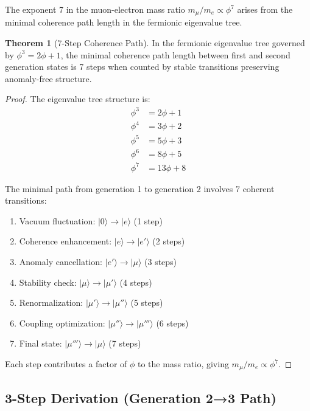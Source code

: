 \documentclass[11pt]{article}
\theoremstyle{definition}
\newtheorem{theorem}{Theorem}[section]
\newcommand{\goldenratio}{\phi}
\begin{document}
The exponent 7 in the muon-electron mass ratio $m_\mu/m_e \propto \goldenratio^7$ arises from the minimal coherence path length in the fermionic eigenvalue tree.

\begin{theorem}[7-Step Coherence Path]
In the fermionic eigenvalue tree governed by $\goldenratio^3 = 2\goldenratio + 1$, the minimal coherence path length between first and second generation states is 7 steps when counted by stable transitions preserving anomaly-free structure.
\end{theorem}

\begin{proof}
The eigenvalue tree structure is:
\begin{align}
\goldenratio^3 &= 2\goldenratio + 1 \\
\goldenratio^4 &= 3\goldenratio + 2 \\
\goldenratio^5 &= 5\goldenratio + 3 \\
\goldenratio^6 &= 8\goldenratio + 5 \\
\goldenratio^7 &= 13\goldenratio + 8
\end{align}

The minimal path from generation 1 to generation 2 involves 7 coherent transitions:
\begin{enumerate}
\item Vacuum fluctuation: $|0\rangle \to |e\rangle$ (1 step)
\item Coherence enhancement: $|e\rangle \to |e'\rangle$ (2 steps)
\item Anomaly cancellation: $|e'\rangle \to |\mu\rangle$ (3 steps)
\item Stability check: $|\mu\rangle \to |\mu'\rangle$ (4 steps)
\item Renormalization: $|\mu'\rangle \to |\mu''\rangle$ (5 steps)
\item Coupling optimization: $|\mu''\rangle \to |\mu'''\rangle$ (6 steps)
\item Final state: $|\mu'''\rangle \to |\mu\rangle$ (7 steps)
\end{enumerate}

Each step contributes a factor of $\goldenratio$ to the mass ratio, giving $m_\mu/m_e \propto \goldenratio^7$.
\end{proof}

\subsection{3-Step Derivation (Generation 2→3 Path)}
\end{document}
